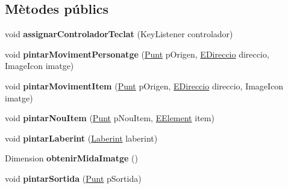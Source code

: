 \subsection*{Mètodes públics}
\begin{DoxyCompactItemize}
\item 
\hypertarget{interfaceinterficie_1_1_i_pintador_laberint_acdd1fc6177c514b992f416ef2aa61ec2}{void {\bfseries assignar\+Controlador\+Teclat} (Key\+Listener controlador)}\label{interfaceinterficie_1_1_i_pintador_laberint_acdd1fc6177c514b992f416ef2aa61ec2}

\item 
\hypertarget{interfaceinterficie_1_1_i_pintador_laberint_aafb217de7602afc7e2534b21d9edf3fc}{void {\bfseries pintar\+Moviment\+Personatge} (\hyperlink{classlogica_1_1_punt}{Punt} p\+Origen, \hyperlink{enumlogica_1_1enumeracions_1_1_e_direccio}{E\+Direccio} direccio, Image\+Icon imatge)}\label{interfaceinterficie_1_1_i_pintador_laberint_aafb217de7602afc7e2534b21d9edf3fc}

\item 
\hypertarget{interfaceinterficie_1_1_i_pintador_laberint_ac94f8e147f795a3b75f911b36e3f4cfe}{void {\bfseries pintar\+Moviment\+Item} (\hyperlink{classlogica_1_1_punt}{Punt} p\+Origen, \hyperlink{enumlogica_1_1enumeracions_1_1_e_direccio}{E\+Direccio} direccio, Image\+Icon imatge)}\label{interfaceinterficie_1_1_i_pintador_laberint_ac94f8e147f795a3b75f911b36e3f4cfe}

\item 
\hypertarget{interfaceinterficie_1_1_i_pintador_laberint_af2f3db2e7020f3e39364deddb9c9b8a2}{void {\bfseries pintar\+Nou\+Item} (\hyperlink{classlogica_1_1_punt}{Punt} p\+Nou\+Item, \hyperlink{enumlogica_1_1enumeracions_1_1_e_element}{E\+Element} item)}\label{interfaceinterficie_1_1_i_pintador_laberint_af2f3db2e7020f3e39364deddb9c9b8a2}

\item 
\hypertarget{interfaceinterficie_1_1_i_pintador_laberint_ad2d79f039cd3d67af2ad0d2e12f99e99}{void {\bfseries pintar\+Laberint} (\hyperlink{classlogica_1_1laberints_1_1_laberint}{Laberint} laberint)}\label{interfaceinterficie_1_1_i_pintador_laberint_ad2d79f039cd3d67af2ad0d2e12f99e99}

\item 
\hypertarget{interfaceinterficie_1_1_i_pintador_laberint_ae350bcf42cbb83e8ebb6d1883decb555}{Dimension {\bfseries obtenir\+Mida\+Imatge} ()}\label{interfaceinterficie_1_1_i_pintador_laberint_ae350bcf42cbb83e8ebb6d1883decb555}

\item 
\hypertarget{interfaceinterficie_1_1_i_pintador_laberint_ae8e250a2c2a2f745e6700bf65be9fe9a}{void {\bfseries pintar\+Sortida} (\hyperlink{classlogica_1_1_punt}{Punt} p\+Sortida)}\label{interfaceinterficie_1_1_i_pintador_laberint_ae8e250a2c2a2f745e6700bf65be9fe9a}

\end{DoxyCompactItemize}


